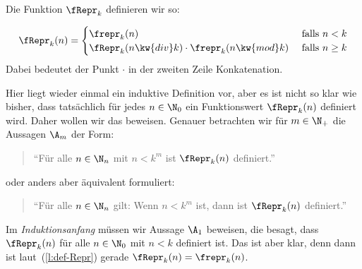 Die Funktion $\fRepr_k$ definieren wir so:
%
\begin{samepage}
\begin{align}
  \fRepr_k(n) =
  \begin{cases}
    \frepr_k(n) & \text{ falls } n < k \\
    \fRepr_k(n \kw{ div } k) \cdot \frepr_k(n \kw{ mod } k) & \text{ falls } n \geq k
  \end{cases}
                                                              \label{l:def-Repr}
\end{align}
%
Dabei bedeutet der Punkt $\cdot$ in der zweiten Zeile Konkatenation.
\end{samepage}
%
Hier liegt wieder einmal ein induktive Definition vor, aber es ist
nicht so klar wie bisher, dass tatsächlich für jedes $n\in\N_0$
ein Funktionswert $\fRepr_k(n)$ definiert wird.
%
Daher wollen wir das beweisen.
%
Genauer betrachten wir für $m\in\N_+$ die Aussagen $\A_m$ der Form:
\begin{quote}
  "`Für alle $n\in\N_n$ mit $n< k^m$ ist $\fRepr_k(n)$ definiert."'
\end{quote}
oder anders aber äquivalent formuliert:
\begin{quote}
  "`Für alle $n\in\N_n$
  gilt: Wenn $n< k^m$ ist, dann ist $\fRepr_k(n)$ definiert."'
\end{quote}
%
Im \emph{Induktionsanfang} müssen wir Aussage $\A_1$
beweisen, die besagt, dass $\fRepr_k(n)$
für alle $n\in\N_0$ mit $n<k$ definiert ist.
%
Das ist aber klar, denn dann ist laut~(\ref{l:def-Repr}) gerade
$\fRepr_k(n)=\frepr_k(n)$.

